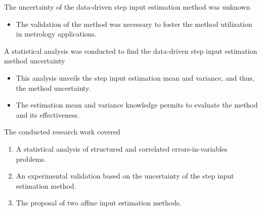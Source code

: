 \documentclass[presentation]{beamer}
\begin{document}
\begin{frame}[label={slide:need}]{The uncertainty of the data-driven step input estimation method was unknown}
\begin{itemize}
\item The validation of the method was necessary to foster \linebreak the method utilization in metrology applications. 
\end{itemize}
\end{frame}

\begin{frame}[label={slide:objective}]{A statistical analysis was conducted to find the data-driven step input estimation method uncertainty}
\begin{itemize}
\item This analysis unveils the step input estimation mean and variance, and thus, the method uncertainty.  
\item The estimation mean and variance knowledge permits to evaluate the method and its effectiveness. 
\end{itemize}
\end{frame}


\begin{frame}[label={slide:plan}]{The conducted research work covered}
\begin{enumerate}
\item A statistical analysis of structured and correlated errors-in-variables problems. 
\item An experimental validation based on the uncertainty of \linebreak the step input estimation method. 
\item The proposal of two affine input estimation methods. 
\end{enumerate}
\end{frame}
\end{document}
